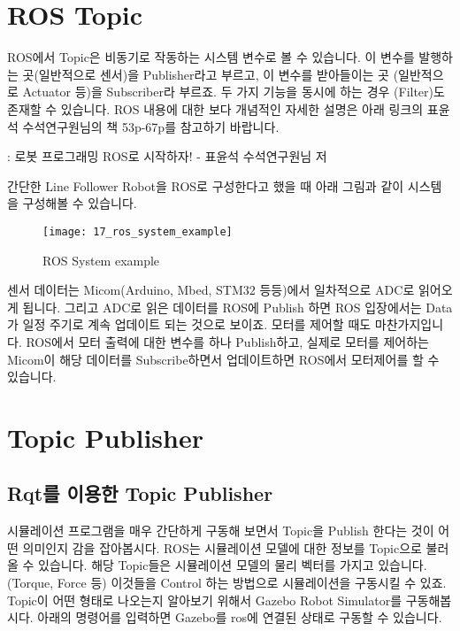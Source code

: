 \documentclass[11pt,fleqn]{book} %
\begin{document}
\section{ROS Topic}

ROS에서 Topic은 비동기로 작동하는 시스템 변수로 볼 수 있습니다. 이 변수를 발행하는 곳(일반적으로 센서)을 Publisher라고 부르고,
이 변수를 받아들이는 곳 (일반적으로 Actuator 등)을 Subscriber라 부르죠. 두 가지 기능을 동시에 하는 경우 (Filter)도 존재할 수 있습니다.
ROS 내용에 대한 보다 개념적인 자세한 설명은 아래 링크의 표윤석 수석연구원님의 책 53p-67p를 참고하기 바랍니다.

\begin{link}
  : 로봇 프로그래밍 ROS로 시작하자! - 표윤석 수석연구원님 저
\end{link}

간단한 Line Follower Robot을 ROS로 구성한다고 했을 때 아래 그림과 같이 시스템을 구성해볼 수 있습니다.

\begin{figure}[h]
\centering\texttt{[image: 17\_ros\_system\_example]}
\caption{ROS System example}
\end{figure}

센서 데이터는 Micom(Arduino, Mbed, STM32 등등)에서 일차적으로 ADC로 읽어오게 됩니다. 그리고 ADC로 읽은 데이터를 ROS에 Publish 하면 ROS 입장에서는 Data가 일정 주기로 계속 업데이트 되는 것으로 보이죠.
모터를 제어할 때도 마찬가지입니다. ROS에서 모터 출력에 대한 변수를 하나 Publish하고, 실제로 모터를 제어하는 Micom이 해당 데이터를 Subscribe하면서 업데이트하면 ROS에서 모터제어를 할 수 있습니다.

\section{Topic Publisher}

\subsection{Rqt를 이용한 Topic Publisher}

시뮬레이션 프로그램을 매우 간단하게 구동해 보면서 Topic을 Publish 한다는 것이 어떤 의미인지 감을 잡아봅시다. ROS는 시뮬레이션 모델에 대한 정보를 Topic으로 불러올 수 있습니다.
해당 Topic들은 시뮬레이션 모델의 물리 벡터를 가지고 있습니다.(Torque, Force 등)
이것들을 Control 하는 방법으로 시뮬레이션을 구동시킬 수 있죠. Topic이 어떤 형태로 나오는지 알아보기 위해서 Gazebo Robot Simulator를 구동해봅시다.
아래의 명령어를 입력하면 Gazebo를 ros에 연결된 상태로 구동할 수 있습니다.
\end{document}
